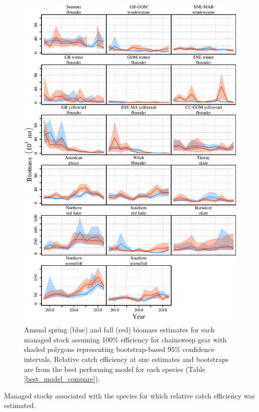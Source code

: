 \documentclass[]{article}
\begin{document}
\begin{figure}
\caption{Annual spring (blue) and fall (red) biomass estimates for each managed stock assuming 100\% efficiency for chainsweep gear with shaded polygons representing bootstrap-based 95\% confidence intervals. Relative catch efficiency at size estimates and bootstraps are from the best performing model for each species (Table \ref{best_model_compare}).}\label{stock_biomass_plot}
\begin{center}
\includegraphics[height = 0.8\textheight]{stock_biomass_plot.pdf}
\end{center}
\end{figure}

\begin{table}
\caption{Managed stocks associated with the species for which relative catch efficiency was estimated.}\label{stock_definition_table}
{}
\end{table}
\end{document}
